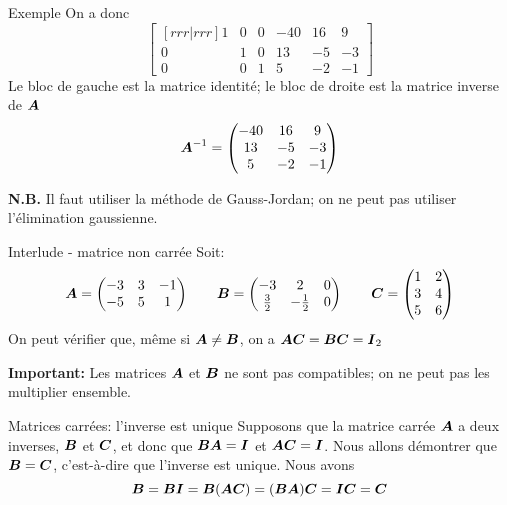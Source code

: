 \documentclass[french]{beamer}
\begin{document}
\begin{frame}{Exemple}
On a donc
\[
      \begin{bmatrix}[rrr|rrr]
    1 & 0 & 0 & -40 & 16 & 9\\
    0 & 1 & 0 & 13 & -5 & -3 \\
    0 & 0 & 1 & 5 & -2 & -1
    \end{bmatrix} 
\]
Le bloc de gauche est la matrice identité; le bloc de droite
est la matrice inverse de $\boldsymbol{A}$
\[
\boldsymbol{A}^{-1} = \begin{pmatrix}
-40 & 16 & 9 \\
13 & -5 & -3 \\
5 & -2 & -1
\end{pmatrix}
\]

\textbf{N.B.} Il faut utiliser la méthode de Gauss-Jordan; on ne peut
 pas utiliser l'élimination gaussienne.
\end{frame}

\begin{frame}{Interlude - matrice non carrée}
Soit:
\[
\boldsymbol{A} = \begin{pmatrix}
-3 & 3 & -1 \\
-5 & 5 & 1
\end{pmatrix}
\qquad
\boldsymbol{B} = \begin{pmatrix}
-3 & 2 & 0 \\
\frac32 & -\frac12 & 0
\end{pmatrix}
\qquad
\boldsymbol{C} = \begin{pmatrix}
1 & 2\\
3 & 4\\
5 & 6
\end{pmatrix}
\]
On peut vérifier que, même si $\boldsymbol{A} \neq \boldsymbol{B}$, on a
$
\boldsymbol{A} \boldsymbol{C} = \boldsymbol{B} \boldsymbol{C} = \boldsymbol{I}_2
$

\textbf{Important:} Les matrices $\boldsymbol{A}$ et $\boldsymbol{B}$ ne sont pas compatibles;
on ne peut pas les multiplier ensemble.
\end{frame}

\begin{frame}{Matrices carrées: l'inverse est unique}
Supposons que la matrice carrée $\boldsymbol{A}$ a deux inverses, $\boldsymbol{B}$ et $\boldsymbol{C}$, et donc que
 $\boldsymbol{B}\boldsymbol{A} = \boldsymbol{I}$ et $\boldsymbol{A}\boldsymbol{C}=\boldsymbol{I}$. Nous allons démontrer que $\boldsymbol{B}=\boldsymbol{C}$, c'est-à-dire que l'inverse est unique. Nous avons
 \[
 \boldsymbol{B} = \boldsymbol{B}\boldsymbol{I} = \boldsymbol{B}(\boldsymbol{A}\boldsymbol{C}) = (\boldsymbol{B}\boldsymbol{A})\boldsymbol{C} =\boldsymbol{I}\boldsymbol{C} = \boldsymbol{C}
 \]

\end{frame}
\end{document}
